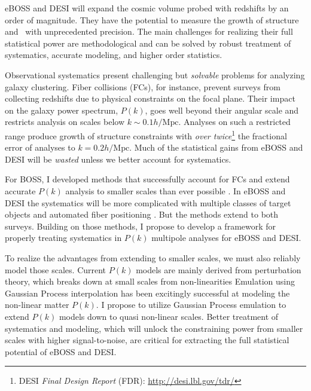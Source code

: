 eBOSS and DESI will expand the cosmic volume probed with redshifts by an order of magnitude. 
They have the potential to measure the growth of structure and \mneut~with unprecedented precision.
The main challenges for realizing their full statistical power are methodological and can be solved by robust treatment of systematics, accurate modeling, and higher order statistics.

Observational systematics present challenging but {\em solvable} problems for analyzing galaxy clustering. 
Fiber collisions (FCs), for instance, prevent surveys from collecting redshifts due to physical constraints on the focal plane. 
Their impact on the galaxy power spectrum, $P(k)$, goes well beyond their angular scale and restricts analysis on scales below $k{\sim}0.1 h/\mathrm{Mpc}$.
Analyses on such a restricted range produce growth of structure constraints with {\em over twice}\footnote{DESI \textit{Final Design Report} (FDR): \url{http://desi.lbl.gov/tdr/}} the fractional error of analyses to $k{=} 0.2 h/\mathrm{Mpc}$. 
Much of the statistical gains from eBOSS and DESI will be {\em wasted} unless we better account for systematics. 

For BOSS, I developed methods that successfully account for FCs and extend accurate $P(k)$ analysis to smaller scales than ever possible \citep[$k{\sim}0.3h/\mathrm{Mpc}$;][]{fibcol}.
In eBOSS and DESI the systematics will be more complicated with multiple classes of target objects and automated fiber positioning \citep{desi_fib, eboss}. 
But the \cite{fibcol} methods extend to both surveys. 
Building on those methods, I propose to develop a framework for properly treating systematics in $P(k)$ multipole analyses for eBOSS and DESI.

To realize the advantages from extending to smaller scales, we must also reliably model those scales. 
Current $P(k)$ models are mainly derived from perturbation theory, which breaks down at small scales from non-linearities%
Emulation using Gaussian Process interpolation has been excitingly successful at modeling the non-linear matter $P(k)$. %
I propose to utilize Gaussian Process emulation to extend $P(k)$ models down to quasi non-linear scales. 
Better treatment of systematics and modeling, which will unlock the constraining power from smaller scales with higher signal-to-noise, are critical for extracting the full statistical potential of eBOSS and DESI.

